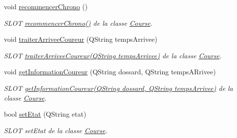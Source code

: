 \begin{DoxyCompactItemize}
void \hyperlink{class_course_addeae907c4bc0a268f51479041de389c}{recommencer\+Chrono} ()
\begin{DoxyCompactList}\small\item\em S\+L\+OT \hyperlink{class_course_addeae907c4bc0a268f51479041de389c}{recommencer\+Chrono()} de la classe \hyperlink{class_course}{Course}. \end{DoxyCompactList}\item 
void \hyperlink{class_course_a60073d16efd4ccefa81bddb4aaa88fab}{traiter\+Arrivee\+Coureur} (Q\+String temps\+Arrivee)
\begin{DoxyCompactList}\small\item\em S\+L\+OT \hyperlink{class_course_a60073d16efd4ccefa81bddb4aaa88fab}{traiter\+Arrivee\+Coureur(\+Q\+String temps\+Arrivee)} de la classe \hyperlink{class_course}{Course}. \end{DoxyCompactList}\item 
void \hyperlink{class_course_a7ba5d2c9865065e95f49a24fbeec7857}{get\+Information\+Coureur} (Q\+String dossard, Q\+String temps\+A\+Rrivee)
\begin{DoxyCompactList}\small\item\em S\+L\+OT \hyperlink{class_course_a7ba5d2c9865065e95f49a24fbeec7857}{get\+Information\+Coureur(\+Q\+String dossard, Q\+String temps\+Arrivee)} de la classe \hyperlink{class_course}{Course}. \end{DoxyCompactList}\item 
bool \hyperlink{class_course_a3ebcde1fa443cb20d71fb98af4d0c418}{set\+Etat} (Q\+String etat)
\begin{DoxyCompactList}\small\item\em S\+L\+OT set\+Etat de la classe \hyperlink{class_course}{Course}. \end{DoxyCompactList}\end{DoxyCompactItemize}
